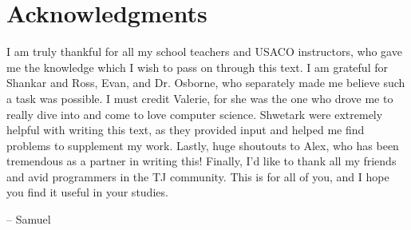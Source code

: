 \chapter{Acknowledgments}

I am truly thankful for all my school teachers and USACO instructors, who gave me the knowledge which I wish to pass on through this text. I am grateful for Shankar and Ross, Evan, and Dr. Osborne, who separately made me believe such a task was possible. I must credit Valerie, for she was the one who drove me to really dive into and come to love computer science. Shwetark were extremely helpful with writing this text, as they provided input and helped me find problems to supplement my work. Lastly, huge shoutouts to Alex, who has been tremendous as a partner in writing this! Finally, I'd like to thank all my friends and avid programmers in the TJ community. This is for all of you, and I hope you find it useful in your studies.

\begin{flushright}
-- Samuel
\end{flushright}